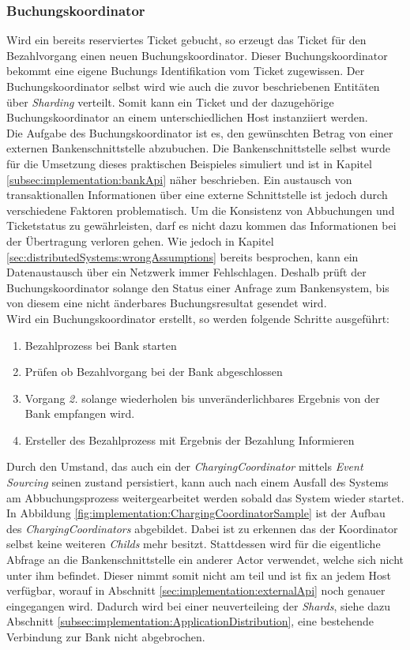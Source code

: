 \subsubsection{Buchungskoordinator}
\label{subsub:implementation:ChargingCoordinator}
Wird ein bereits reserviertes Ticket gebucht, so erzeugt das Ticket für den Bezahlvorgang einen neuen Buchungskoordinator. Dieser Buchungskoordinator bekommt eine eigene Buchungs Identifikation vom Ticket zugewissen. Der Buchungskoordinator selbst wird wie auch die zuvor beschriebenen Entitäten über \textit{Sharding} verteilt. Somit kann ein Ticket und der dazugehörige Buchungskoordinator an einem unterschiedlichen Host instanziiert werden. \\
Die Aufgabe des Buchungskoordinator ist es, den gewünschten Betrag von einer externen Bankenschnittstelle abzubuchen. Die Bankenschnittstelle selbst wurde für die Umsetzung dieses praktischen Beispieles simuliert und ist in Kapitel \ref{subsec:implementation:bankApi} näher beschrieben. Ein austausch von transaktionallen Informationen über eine externe Schnittstelle ist jedoch durch verschiedene Faktoren problematisch. Um die Konsistenz von Abbuchungen und Ticketstatus zu gewährleisten, darf es nicht dazu kommen das Informationen bei der Übertragung verloren gehen. Wie jedoch in Kapitel \ref{sec:distributedSystems:wrongAssumptions} bereits besprochen, kann ein Datenaustausch über ein Netzwerk immer Fehlschlagen. Deshalb prüft der Buchungskoordinator solange den Status einer Anfrage zum Bankensystem, bis von diesem eine nicht änderbares Buchungsresultat gesendet wird. \\
Wird ein Buchungskoordinator erstellt, so werden folgende Schritte ausgeführt:
\begin{enumerate}
    \item Bezahlprozess bei Bank starten
    \item Prüfen ob Bezahlvorgang bei der Bank abgeschlossen
    \item Vorgang \textit{2.} solange wiederholen bis unveränderlichbares Ergebnis von der Bank empfangen wird.
    \item Ersteller des Bezahlprozess mit Ergebnis der Bezahlung Informieren
\end{enumerate}
Durch den Umstand, das auch ein der \textit{ChargingCoordinator} mittels \textit{Event Sourcing} seinen zustand persistiert, kann auch nach einem Ausfall des Systems am Abbuchungsprozess weitergearbeitet werden sobald das System wieder startet. \\
In Abbildung \ref{fig:implementation:ChargingCoordinatorSample} ist der Aufbau des \textit{ChargingCoordinators} abgebildet. Dabei ist zu erkennen das der Koordinator selbst keine weiteren \textit{Childs} mehr besitzt. Stattdessen wird für die eigentliche Abfrage an die Bankenschnittstelle ein anderer Actor verwendet, welche sich nicht unter ihm befindet. Dieser nimmt somit nicht am  teil und ist fix an jedem Host verfügbar, worauf in Abschnitt \ref{sec:implementation:externalApi} noch genauer eingegangen wird. Dadurch wird bei einer neuverteileing der \textit{Shards}, siehe dazu Abschnitt \ref{subsec:implementation:ApplicationDistribution}, eine bestehende Verbindung zur Bank nicht abgebrochen. 
